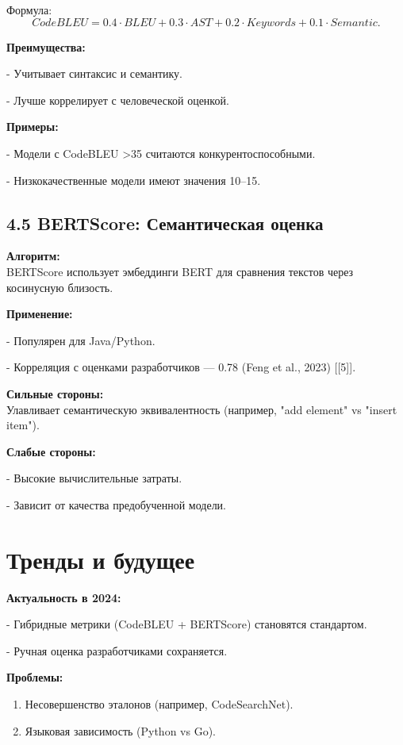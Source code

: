 Формула:
\[
CodeBLEU = 0.4 \cdot BLEU + 0.3 \cdot AST + 0.2 \cdot Keywords + 0.1 \cdot Semantic.
\]

\textbf{Преимущества:}

    
- Учитывает синтаксис и семантику.
    
- Лучше коррелирует с человеческой оценкой.


\textbf{Примеры:}

    
- Модели с CodeBLEU >35 считаются конкурентоспособными.
    
- Низкокачественные модели имеют значения 10–15.


\subsection*{4.5 BERTScore: Семантическая оценка}

\textbf{Алгоритм:} \\
BERTScore использует эмбеддинги BERT для сравнения текстов через косинусную близость.

\textbf{Применение:}

    
- Популярен для Java/Python.
    
- Корреляция с оценками разработчиков — 0.78 (Feng et al., 2023) [[5]].


\textbf{Сильные стороны:} \\
Улавливает семантическую эквивалентность (например, "add element" vs "insert item").

\textbf{Слабые стороны:}

    
- Высокие вычислительные затраты.
    
- Зависит от качества предобученной модели.


\section*{Тренды и будущее}

\textbf{Актуальность в 2024:}

    
- Гибридные метрики (CodeBLEU + BERTScore) становятся стандартом.
    
- Ручная оценка разработчиками сохраняется.


\textbf{Проблемы:}
\begin{enumerate}
    \item Несовершенство эталонов (например, CodeSearchNet).
    \item Языковая зависимость (Python vs Go).
\end{enumerate}

